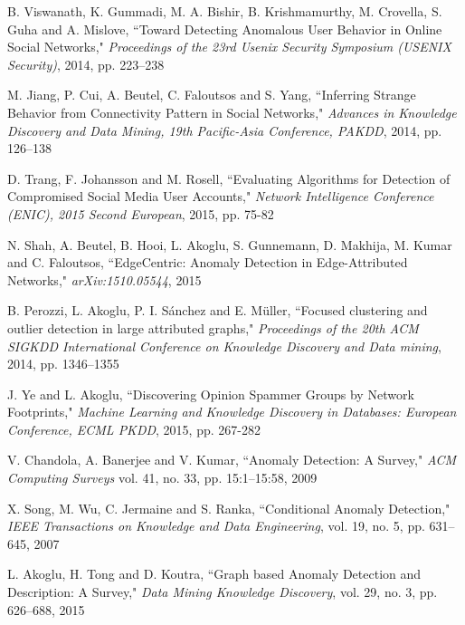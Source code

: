 \documentclass[11pt, oneside]{article}   	%
\begin{document}
\begin{thebibliography}{123}
 B. Viswanath, K. Gummadi, M. A. Bishir, B. Krishmamurthy, M. Crovella, S. Guha and A. Mislove, ``Toward Detecting Anomalous User Behavior in Online Social Networks," \emph{Proceedings of the 23rd Usenix Security Symposium (USENIX Security)}, 2014, pp. 223--238

 M. Jiang, P. Cui, A. Beutel, C. Faloutsos and S. Yang, ``Inferring Strange Behavior from Connectivity Pattern in Social Networks," \emph{Advances in Knowledge Discovery and Data Mining, 19th Pacific-Asia Conference, PAKDD}, 2014, pp. 126--138

 D. Trang, F. Johansson and M. Rosell, ``Evaluating Algorithms for Detection of Compromised Social Media User Accounts," \emph{Network Intelligence Conference (ENIC), 2015 Second European}, 2015, pp. 75-82

 N. Shah, A. Beutel, B. Hooi, L. Akoglu, S. Gunnemann, D. Makhija, M. Kumar and C. Faloutsos, ``EdgeCentric: Anomaly Detection in Edge-Attributed Networks," \emph{arXiv:1510.05544}, 2015

 B. Perozzi, L. Akoglu, P. I. Sánchez and E. Müller, ``Focused clustering and outlier detection in large attributed graphs," \emph{Proceedings of the 20th ACM SIGKDD International Conference on Knowledge Discovery and Data mining}, 2014, pp. 1346--1355

 J. Ye and L. Akoglu, ``Discovering Opinion Spammer Groups by Network Footprints," \emph{Machine Learning and Knowledge Discovery in Databases: European Conference, ECML PKDD}, 2015, pp. 267-282

 V. Chandola, A. Banerjee and V. Kumar, ``Anomaly Detection: A Survey," \emph{ACM Computing Surveys} vol. 41, no. 33, pp. 15:1--15:58, 2009

 X. Song, M. Wu, C. Jermaine and S. Ranka, ``Conditional Anomaly Detection," \emph{IEEE Transactions on Knowledge and Data Engineering}, vol. 19, no. 5, pp. 631--645, 2007

 L. Akoglu, H. Tong and D. Koutra, ``Graph based Anomaly Detection and Description: A Survey," \emph{Data Mining Knowledge Discovery}, vol. 29, no. 3, pp. 626--688, 2015

\end{thebibliography}
\end{document}
